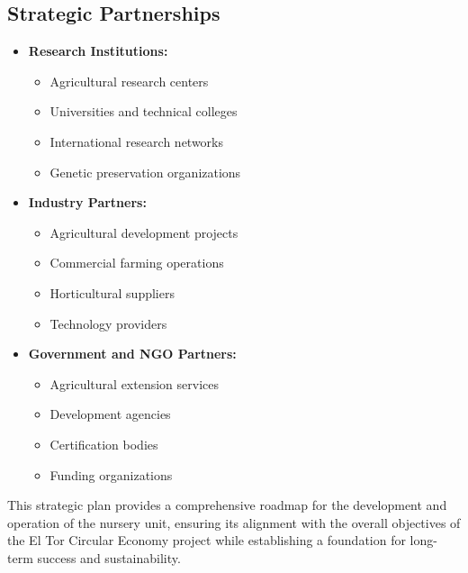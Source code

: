 \subsection{Strategic Partnerships}
\begin{itemize}
    \item \textbf{Research Institutions:}
    \begin{itemize}
        \item Agricultural research centers
        \item Universities and technical colleges
        \item International research networks
        \item Genetic preservation organizations
    \end{itemize}
    
    \item \textbf{Industry Partners:}
    \begin{itemize}
        \item Agricultural development projects
        \item Commercial farming operations
        \item Horticultural suppliers
        \item Technology providers
    \end{itemize}
    
    \item \textbf{Government and NGO Partners:}
    \begin{itemize}
        \item Agricultural extension services
        \item Development agencies
        \item Certification bodies
        \item Funding organizations
    \end{itemize}
\end{itemize}

This strategic plan provides a comprehensive roadmap for the development and operation of the nursery unit, ensuring its alignment with the overall objectives of the El Tor Circular Economy project while establishing a foundation for long-term success and sustainability. 